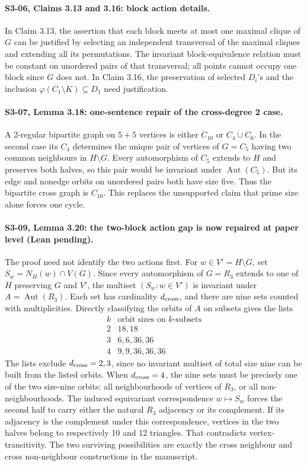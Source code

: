 \documentclass{article}
\begin{document}
\paragraph{S3-06, Claims 3.13 and 3.16: block action details.}
In Claim 3.13, the assertion that each block meets at most
one maximal clique of \(G\) can be justified by selecting an
independent transversal of the maximal cliques and extending all
its permutations. The invariant block-equivalence relation must
be constant on unordered pairs of that transversal; all points
cannot occupy one block since \(G\) does not. In Claim 3.16,
the preservation of selected \(D_i\)'s and the inclusion
\(\varphi(C_1\setminus K)\subseteq D_1\) need justification.
\paragraph{S3-07, Lemma 3.18: one-sentence repair of the cross-degree 2 case.}
A 2-regular bipartite graph on \(5+5\) vertices is either
\(C_{10}\) or \(C_4\dot\cup C_6\).
In the second case its \(C_4\) determines the unique pair of
vertices of \(G=C_5\) having two common neighbours in
\(H\setminus G\). Every automorphism of \(C_5\) extends to \(H\)
and preserves both halves, so this pair would be invariant
under \(\operatorname{Aut}(C_5)\). But its edge and nonedge
orbits on unordered pairs both have size five.
Thus the bipartite cross graph is \(C_{10}\).
This replaces the unsupported claim that prime size alone
forces one cycle.
\paragraph{S3-09, Lemma 3.20: the two-block action gap is now
repaired at paper level (Lean pending).}
The proof need not identify the two actions first. For
\(w\in V'=H\setminus G\), set \(S_w=N_H(w)\cap V(G)\).
Since every automorphism of \(G=R_3\) extends to one of \(H\)
preserving \(G\) and \(V'\), the multiset
\((S_w:w\in V')\) is invariant under
\(A=\operatorname{Aut}(R_3)\).
Each set has cardinality \(d_{\rm cross}\), and there are
nine sets counted with multiplicities. Directly classifying
the orbits of \(A\) on subsets gives the lists
\[
\begin{array}{c|l}
k&\text{orbit sizes on }k\text{-subsets}\\ \hline
2 &18,18\\
3 &6,6,36,36\\
4 &9,9,36,36,36
\end{array}
\]
The lists exclude \(d_{\rm cross}=2,3\), since no invariant
multiset of total size nine can be built from the listed
orbits. When \(d_{\rm cross}=4\), the nine sets must be
precisely one of the two size-nine orbits: all neighbourhoods
of vertices of \(R_3\), or all non-neighbourhoods.
The induced equivariant correspondence \(w\mapsto S_w\)
forces the second half to carry either the natural
\(R_3\) adjacency or its complement. If its adjacency is
the complement under this correspondence, vertices in the
two halves belong to respectively 10 and 12 triangles.
That contradicts vertex-transitivity. The two surviving
possibilities are exactly the cross neighbour and
cross non-neighbour constructions in the manuscript.
\end{document}
